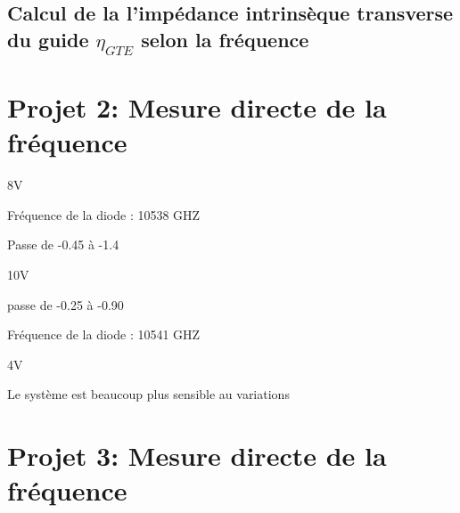 \subsection{Calcul de la l'impédance intrinsèque transverse du guide $\eta_{GTE}$ selon la fréquence}


\section{Projet 2: Mesure directe de la fréquence}
8V

Fréquence de la diode : 10538 GHZ

Passe de -0.45 à -1.4

10V

passe de -0.25 à -0.90

Fréquence de la diode : 10541 GHZ

4V

Le système est beaucoup plus sensible au variations

\section{Projet 3: Mesure directe de la fréquence}